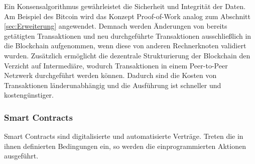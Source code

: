 Ein Konsensalgorithmus gewährleistet die Sicherheit und Integrität der Daten.
Am Beispiel des Bitcoin wird das Konzept \glqq Proof-of-Work\grqq{} analog zum Abschnitt 
\ref{sec:Erweiterung} angewendet. Demnach werden Änderungen von bereits getätigten
Transaktionen und neu durchgeführte Transaktionen ausschließlich in die Blockchain
aufgenommen, wenn diese von anderen Rechnerknoten validiert wurden.
Zusätzlich ermöglicht die dezentrale Strukturierung der Blockchain den Verzicht auf 
Intermediäre, wodurch Transaktionen in einem Peer-to-Peer Netzwerk 
durchgeführt werden können.
\cite[p.~23]{fill2020blockchain}
Dadurch sind die Kosten von Transaktionen länderunabhängig \cite[p.~12]{pirafelnerblockchaintechnologie}
und die Ausführung ist schneller 
und kostengünstiger. \cite[p.~168]{chowdhary2025smart}


\subsubsection{Smart Contracts}
\label{sec:SmartContracts}
Smart Contracts sind digitalisierte und automatisierte Verträge.
\cite[p.~14]{pirafelnerblockchaintechnologie}
Treten die in ihnen definierten Bedingungen ein, so werden die einprogrammierten Aktionen
ausgeführt.
\cite[p.~55f]{fill2020blockchain}

